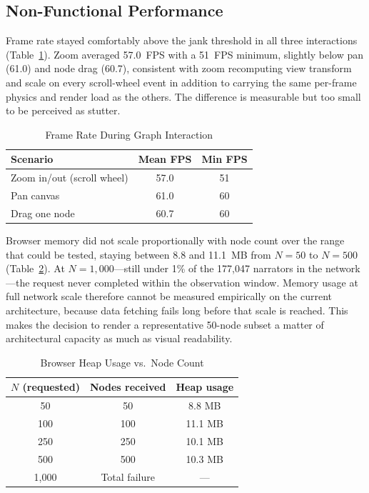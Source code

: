 \documentclass[conference]{IEEEtran}
\begin{document}
\subsection{Non-Functional Performance}

Frame rate stayed comfortably above the jank threshold in all three interactions
(Table~\ref{tab:fps}). Zoom averaged 57.0~FPS with a 51~FPS minimum, slightly
below pan (61.0) and node drag (60.7), consistent with zoom recomputing view
transform and scale on every scroll-wheel event in addition to carrying the same
per-frame physics and render load as the others. The difference is measurable but
too small to be perceived as stutter.

\begin{table}[!t]
\caption{Frame Rate During Graph Interaction}
\label{tab:fps}
\centering
\renewcommand{\arraystretch}{1.3}
\begin{tabular}{lcc}
\toprule
Scenario & Mean FPS & Min FPS \\
\midrule
Zoom in/out (scroll wheel) & 57.0 & 51 \\
Pan canvas                 & 61.0 & 60 \\
Drag one node              & 60.7 & 60 \\
\bottomrule
\end{tabular}
\end{table}

Browser memory did not scale proportionally with node count over the range that
could be tested, staying between 8.8 and 11.1~MB from $N=50$ to $N=500$
(Table~\ref{tab:memori}). At $N=1{,}000$---still under 1\% of the 177{,}047
narrators in the network---the request never completed within the observation
window. Memory usage at full network scale therefore cannot be measured
empirically on the current architecture, because data fetching fails long before
that scale is reached. This makes the decision to render a representative
50-node subset a matter of architectural capacity as much as visual readability.

\begin{table}[!t]
\caption{Browser Heap Usage vs.\ Node Count}
\label{tab:memori}
\centering
\renewcommand{\arraystretch}{1.3}
\begin{tabular}{ccc}
\toprule
$N$ (requested) & Nodes received & Heap usage \\
\midrule
50      & 50      & 8.8 MB \\
100     & 100     & 11.1 MB \\
250     & 250     & 10.1 MB \\
500     & 500     & 10.3 MB \\
1{,}000 & Total failure & --- \\
\bottomrule
\end{tabular}
\end{table}
\end{document}
